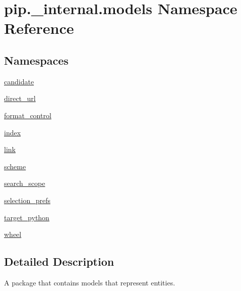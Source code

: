 \hypertarget{namespacepip_1_1__internal_1_1models}{}\section{pip.\+\_\+internal.\+models Namespace Reference}
\label{namespacepip_1_1__internal_1_1models}
\subsection*{Namespaces}
\begin{DoxyCompactItemize}
\item 
 \hyperlink{namespacepip_1_1__internal_1_1models_1_1candidate}{candidate}
\item 
 \hyperlink{namespacepip_1_1__internal_1_1models_1_1direct__url}{direct\+\_\+url}
\item 
 \hyperlink{namespacepip_1_1__internal_1_1models_1_1format__control}{format\+\_\+control}
\item 
 \hyperlink{namespacepip_1_1__internal_1_1models_1_1index}{index}
\item 
 \hyperlink{namespacepip_1_1__internal_1_1models_1_1link}{link}
\item 
 \hyperlink{namespacepip_1_1__internal_1_1models_1_1scheme}{scheme}
\item 
 \hyperlink{namespacepip_1_1__internal_1_1models_1_1search__scope}{search\+\_\+scope}
\item 
 \hyperlink{namespacepip_1_1__internal_1_1models_1_1selection__prefs}{selection\+\_\+prefs}
\item 
 \hyperlink{namespacepip_1_1__internal_1_1models_1_1target__python}{target\+\_\+python}
\item 
 \hyperlink{namespacepip_1_1__internal_1_1models_1_1wheel}{wheel}
\end{DoxyCompactItemize}


\subsection{Detailed Description}
\begin{DoxyVerb}A package that contains models that represent entities.
\end{DoxyVerb}
 